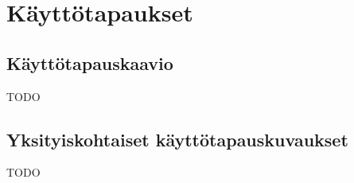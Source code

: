 \chapter{Käyttötapaukset}

\section{Käyttötapauskaavio}
TODO

\section{Yksityiskohtaiset käyttötapauskuvaukset}
TODO